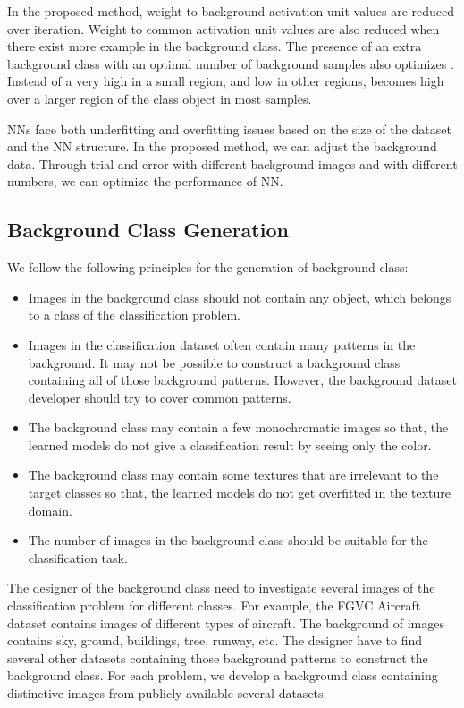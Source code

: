 \documentclass{article}
\begin{document}
In the proposed method,  weight to background activation unit values  are reduced over iteration. Weight to common activation unit values  are also reduced when there exist more example in the background class. The presence of an extra background class with an optimal number of background samples also optimizes . Instead of a very high  in a small region, and low  in other regions,  becomes high over a larger region of the class object in most samples. 

NNs face both underfitting and overfitting issues based on the size of the dataset and the NN structure. In the proposed method, we can adjust the background data. Through trial and error with different background images and with different numbers, we can optimize the performance of NN.

\subsection{Background Class Generation}
We follow the following principles for the generation of background class:
\begin{itemize}
  \item Images in the background class should not contain any object, which belongs to a class of the classification problem. 
  \item Images in the classification dataset often contain many patterns in the background. It may not be possible to construct a background class containing all of those background patterns. However, the background dataset developer should try to cover common patterns.
 \item The background class may contain a few monochromatic images so that, the learned models do not give a classification result by seeing only the color. 
 \item The background class may contain some textures that are irrelevant to the target classes so that, the learned models do not get overfitted in the texture domain. 
  \item The number of images in the background class should be suitable for the classification task. 
\end{itemize}
The designer of the background class need to investigate several images of the classification problem for different classes. For example, the FGVC Aircraft dataset contains images of different types of aircraft. The background of images contains sky, ground, buildings, tree, runway, etc. The designer have to find several other datasets containing those background patterns to construct the background class. For each problem, we develop a background class containing distinctive images from publicly available several datasets. 
\end{document}
